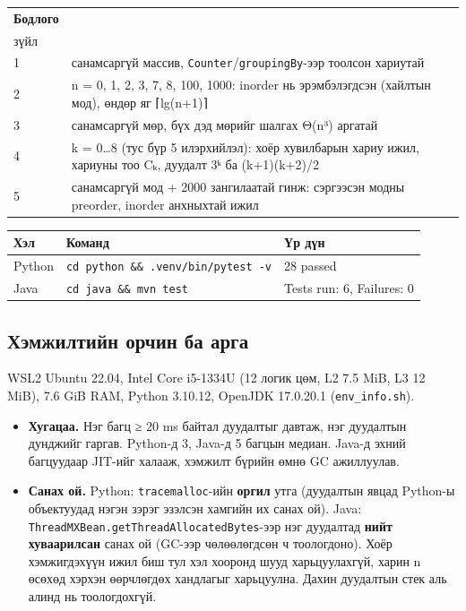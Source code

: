 \documentclass[11pt,a4paper]{article}
\begin{document}
\begin{center}
\small
\begin{tabularx}{\linewidth}{l>{\raggedright\arraybackslash}X}
\toprule
\textbf{Бодлого} & \textbf{\begin{tabular}[b]{@{}l@{}}Шалгасан \\ зүйл\end{tabular}} \\
\midrule
1 & 300 санамсаргүй массив, \texttt{Counter}/\texttt{groupingBy}-ээр тоолсон хариутай \\
2 & n = 0, 1, 2, 3, 7, 8, 100, 1000: inorder нь эрэмбэлэгдсэн (хайлтын мод), өндөр яг ⌈lg(n+1)⌉ \\
3 & 2000 санамсаргүй мөр, бүх дэд мөрийг шалгах Θ(n³) аргатай \\
4 & k = 0…8 (тус бүр 5 илэрхийлэл): хоёр хувилбарын хариу ижил, хариуны тоо Cₖ, дуудалт 3ᵏ ба (k+1)(k+2)/2 \\
5 & 200 санамсаргүй мод + 2000 зангилаатай гинж: сэргээсэн модны preorder, inorder анхныхтай ижил \\
\bottomrule
\end{tabularx}
\end{center}

\begin{center}
\small
\begin{tabularx}{\linewidth}{l>{\raggedright\arraybackslash}Xl}
\toprule
\textbf{Хэл} & \textbf{Команд} & \textbf{Үр дүн} \\
\midrule
Python & \texttt{cd python \&\& .\allowbreak{}venv/\allowbreak{}bin/\allowbreak{}pytest -v} & 28 passed \\
Java & \texttt{cd java \&\& mvn test} & Tests run: 6, Failures: 0 \\
\bottomrule
\end{tabularx}
\end{center}

\subsection{Хэмжилтийн орчин ба арга}
WSL2 Ubuntu 22.04, Intel Core i5-1334U (12 логик цөм, L2 7.5 MiB, L3 12 MiB), 7.6 GiB RAM, Python 3.10.12, OpenJDK 17.0.20.1 (\texttt{env\_\allowbreak{}info.\allowbreak{}sh}).

\begin{itemize}
\item \textbf{Хугацаа.} Нэг багц ≥ 20 ms байтал дуудалтыг давтаж, нэг дуудалтын дунджийг гаргав. Python-д 3, Java-д 5 багцын медиан. Java-д эхний багцуудаар JIT-ийг халааж, хэмжилт бүрийн өмнө GC ажиллуулав.
\item \textbf{Санах ой.} Python: \texttt{tracemalloc}-ийн \textbf{оргил} утга (дуудалтын явцад Python-ы объектуудад нэгэн зэрэг эзэлсэн хамгийн их санах ой). Java: \texttt{ThreadMXBean.\allowbreak{}getThreadAllocatedBytes}-ээр нэг дуудалтад \textbf{нийт хуваарилсан} санах ой (GC-ээр чөлөөлөгдсөн ч тоологдоно). Хоёр хэмжигдэхүүн ижил биш тул хэл хооронд шууд харьцуулахгүй, харин n өсөхөд хэрхэн өөрчлөгдөх хандлагыг харьцуулна. Дахин дуудалтын стек аль алинд нь тоологдохгүй.
\end{itemize}
\end{document}
